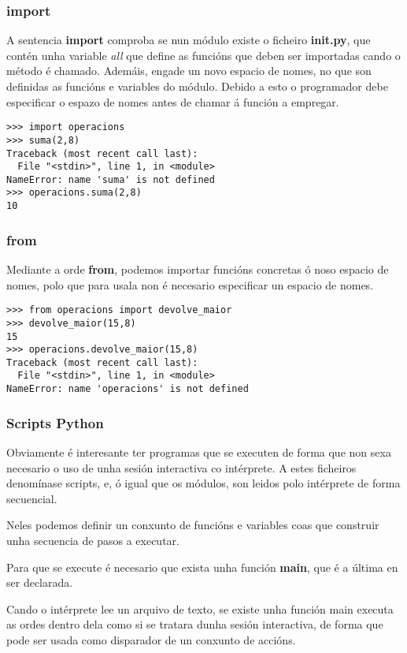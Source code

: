 \begin{frame}[fragile]
  \frametitle{import}
  A sentencia \textbf{import} comproba se nun módulo existe o ficheiro
  \textbf{init.py}, que contén unha variable \emph{all} que define as funcións
  que deben ser importadas cando o método é chamado. Ademáis, engade un novo
  espacio de nomes, no que son definidas as funcións e variables do
  módulo. Debido a esto o programador debe especificar o espazo de nomes antes
  de chamar á función a empregar.

  \small
  \begin{verbatim}
>>> import operacions
>>> suma(2,8)
Traceback (most recent call last):
  File "<stdin>", line 1, in <module>
NameError: name 'suma' is not defined
>>> operacions.suma(2,8)
10
  \end{verbatim}  
  \normalsize
\end{frame}

\begin{frame}[fragile]
  \frametitle{from}
  Mediante a orde \textbf{from}, podemos importar funcións concretas ó noso
  espacio de nomes, polo que para usala non é necesario especificar un espacio
  de nomes.
  \small
  \begin{verbatim}
>>> from operacions import devolve_maior
>>> devolve_maior(15,8)
15
>>> operacions.devolve_maior(15,8)
Traceback (most recent call last):
  File "<stdin>", line 1, in <module>
NameError: name 'operacions' is not defined
  \end{verbatim}
  \normalsize
\end{frame}

\begin{frame}
  \frametitle{Scripts Python}
  Obviamente é interesante ter programas que se executen de forma que non sexa
  necesario o uso de unha sesión interactiva co intérprete. A estes ficheiros
  denomínase scripts, e, ó igual que os módulos, son leidos polo intérprete de
  forma secuencial.

  Neles podemos definir un conxunto de funcións e variables coas que construir
  unha secuencia de pasos a executar.

  Para que se execute é necesario que exista unha función \textbf{main}, que é a
  última en ser declarada.

  Cando o intérprete lee un arquivo de texto, se existe unha función main
  executa as ordes dentro dela como si se tratara dunha sesión interactiva, de
  forma que pode ser usada como disparador de un conxunto de accións.
\end{frame}

